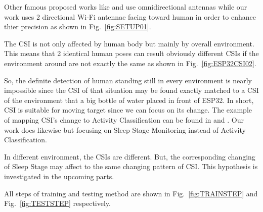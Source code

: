 \documentclass[10pt,letterpaper]{article}
\begin{document}
	Other famous proposed works like \cite{wangF} \cite{liuJ} and \cite{hernandezSM} use omnidirectional antennas while our work uses 2 directional Wi-Fi antennae facing toward human in order to enhance thier precision as shown in Fig.~\ref{fig:SETUP01}.
	
	
	The CSI is not only affected by human body but mainly by overall environment. This means that 2 identical human poses can result obviously different CSIs if the environment around are not exactly the same as shown in Fig.~\ref{fig:ESP32CSI02}.
	
	So, the definite detection of human standing still in every environment is nearly impossible since the CSI of that situation may be found exactly matched to a CSI of the environment that a big bottle of water placed in front of ESP32.
	In short, CSI is suitable for moving target since we can focus on its change. The example of mapping CSI's change to Activity Classification can be found in \cite{chowdhuryTZ} and \cite{zouH}. Our work does likewise but focusing on Sleep Stage Monitoring instead of Activity Classification.
	
	In different environment, the CSIs are different. But, the corresponding changing of Sleep Stage may affect to the same changing pattern of CSI. This hypothesis is investigated in the upcoming parts.
	
	All steps of training and testing method are shown in Fig.~\ref{fig:TRAINSTEP} and Fig.~\ref{fig:TESTSTEP} respectively. 
	
\end{document}
